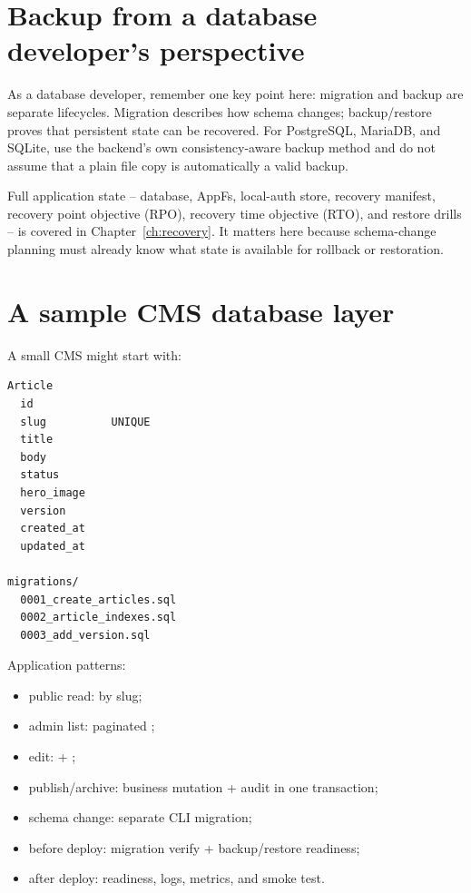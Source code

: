 \section{Backup from a database developer's perspective}

As a database developer, remember one key point here: migration and backup are separate lifecycles. Migration describes how schema changes; backup/restore proves that persistent state can be recovered. For PostgreSQL, MariaDB, and SQLite, use the backend's own consistency-aware backup method and do not assume that a plain file copy is automatically a valid backup.

Full application state -- database, AppFs, local-auth store, recovery manifest, recovery point objective (RPO), recovery time objective (RTO), and restore drills -- is covered in Chapter~\ref{ch:recovery}. It matters here because schema-change planning must already know what state is available for rollback or restoration.

\section{A sample CMS database layer}

A small CMS might start with:

\begin{lstlisting}
Article
  id
  slug          UNIQUE
  title
  body
  status
  hero_image
  version
  created_at
  updated_at

migrations/
  0001_create_articles.sql
  0002_article_indexes.sql
  0003_add_version.sql
\end{lstlisting}

Application patterns:

\begin{itemize}
\item public read:  by slug;
\item admin list: paginated ;
\item edit:  + ;
\item publish/archive: business mutation + audit in one transaction;
\item schema change: separate CLI migration;
\item before deploy: migration verify + backup/restore readiness;
\item after deploy: readiness, logs, metrics, and smoke test.
\end{itemize}

